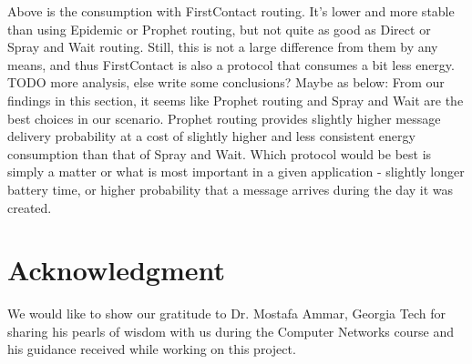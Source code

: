 \documentclass[conference]{IEEEtran}
\begin{document}
Above is the consumption with FirstContact routing. It's lower and more stable than using Epidemic or Prophet routing, but not quite as good as Direct or Spray and Wait routing. Still, this is not a large difference from them by any means, and thus FirstContact is also a protocol that consumes a bit less energy. \\

{\color{red}
  TODO more analysis, else write some conclusions? Maybe as below:
}
From our findings in this section, it seems like Prophet routing and Spray and Wait are the best choices in our scenario. Prophet routing provides slightly higher message delivery probability at a cost of slightly higher and less consistent energy consumption than that of Spray and Wait. Which protocol would be best is simply a matter or what is most important in a given application - slightly longer battery time, or higher probability that a message arrives during the day it was created.


\section*{Acknowledgment}

We would like to show our gratitude to Dr. Mostafa Ammar, Georgia Tech for sharing his pearls of wisdom with us during the Computer Networks course and his guidance received while working on this project.




\end{document}
